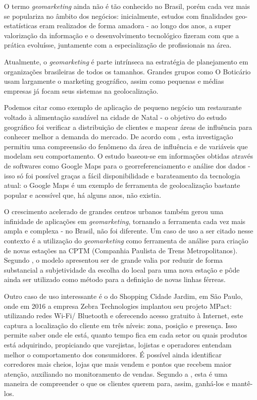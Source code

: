 O termo \emph{geomarketing} ainda não é tão conhecido no Brasil, porém cada
vez mais se populariza no âmbito dos negócios: inicialmente, estudos com finalidades geo-estatísticas eram realizados de forma amadora - ao longo dos anos, a super valorização da informação e o desenvolvimento tecnológico fizeram com que a prática evoluísse, juntamente com a especialização de profissionais na área.

Atualmente, o \emph{geomarketing} é parte intrínseca na estratégia de planejamento em organizações brasileiras de todos os tamanhos. Grandes grupos como O Boticário usam largamente o marketing geográfico, assim como pequenas e médias empresas já focam seus sistemas na geolocalização. 

Podemos citar como exemplo de aplicação de pequeno negócio um restaurante voltado à alimentação saudável na cidade de Natal - o objetivo do estudo geográfico foi verificar a distribuição de clientes e
mapear áreas de influência para conhecer melhor a demanda do mercado. De acordo
com , esta investigação permitiu uma compreensão do
fenômeno da área de influência e de variáveis que modelam seu comportamento. O
estudo baseou-se em informações obtidas através de softwares como Google
Maps para o georreferenciamento e análise dos dados - isso só foi possível
graças a fácil disponibilidade e barateamento da tecnologia atual: o
Google Maps é um exemplo de ferramenta de geolocalização bastante popular
e acessível que, há alguns anos, não existia.

O crescimento acelerado de grandes centros urbanos também gerou uma infinidade de aplicações em \emph{geomarketing}, tornando a ferramenta cada vez mais ampla e
complexa - no Brasil, não foi diferente. Um caso de uso a ser citado nesse contexto é a utilização do
\emph{geomarketing} como ferramenta de análise para criação de novas estações na
CPTM (Companhia Paulista de Trens Metropolitanos). Segundo
, o modelo apresentou ser de grande valia por reduzir de
forma substancial a subjetividade da escolha do local para uma nova estação e
pôde ainda ser utilizado como método para a definição de novas linhas férreas.

Outro caso de uso interessante é o do Shopping Cidade Jardim, em São Paulo, onde em 2016 a empresa Zebra Technologies implantou seu projeto MPact: utilizando redes Wi-Fi/ Bluetooth e oferecendo acesso gratuito à Internet, este captura a localização do cliente em três níveis: zona, posição e presença. Isso permite saber onde ele está, quanto tempo fica em cada setor ou quais produtos está adquirindo, propiciando que varejistas, lojistas e operadores entendam melhor o comportamento dos consumidores. É possível ainda identificar corredores mais cheios, lojas que mais vendem e pontos que recebem maior atenção, auxiliando no monitoramento de vendas. Segundo a , esta é uma maneira de compreender o que os clientes querem para, assim, ganhá-los e mantê-los.

